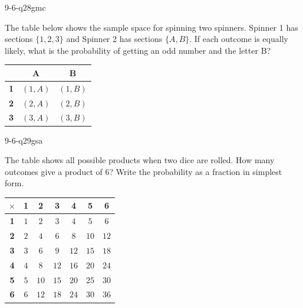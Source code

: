 \begin{practiceQuestion}{9-6-q28}{gmc}
\begin{questionText}
The table below shows the sample space for spinning two spinners. Spinner 1 has sections $\{1, 2, 3\}$ and Spinner 2 has sections $\{A, B\}$. If each outcome is equally likely, what is the probability of getting an odd number and the letter B?

\begin{center}
\begin{tabular}{|c|c|c|}
\hline
 & \textbf{A} & \textbf{B} \\
\hline
\textbf{1} & $(1,A)$ & \cellcolor{funGreen!20}$(1,B)$ \\
\hline
\textbf{2} & $(2,A)$ & $(2,B)$ \\
\hline
\textbf{3} & $(3,A)$ & \cellcolor{funGreen!20}$(3,B)$ \\
\hline
\end{tabular}
\end{center}
\end{questionText}
\end{practiceQuestion}

\begin{practiceQuestion}{9-6-q29}{gsa}
\begin{questionText}
The table shows all possible products when two dice are rolled. How many outcomes give a product of $6$? Write the probability as a fraction in simplest form.

\begin{center}
\begin{tabular}{|c|c|c|c|c|c|c|}
\hline
$\times$ & \textbf{1} & \textbf{2} & \textbf{3} & \textbf{4} & \textbf{5} & \textbf{6} \\
\hline
\textbf{1} & $1$ & $2$ & $3$ & $4$ & $5$ & $6$ \\
\hline
\textbf{2} & $2$ & $4$ & $6$ & $8$ & $10$ & $12$ \\
\hline
\textbf{3} & $3$ & $6$ & $9$ & $12$ & $15$ & $18$ \\
\hline
\textbf{4} & $4$ & $8$ & $12$ & $16$ & $20$ & $24$ \\
\hline
\textbf{5} & $5$ & $10$ & $15$ & $20$ & $25$ & $30$ \\
\hline
\textbf{6} & $6$ & $12$ & $18$ & $24$ & $30$ & $36$ \\
\hline
\end{tabular}
\end{center}
\end{questionText}
\end{practiceQuestion}

